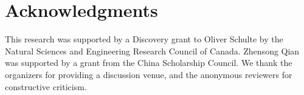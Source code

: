 \documentclass{acm_proc_article-sp}
\begin{document}
\section{Acknowledgments}

This research was supported by a Discovery grant to Oliver Schulte by the Natural Sciences and Engineering Research Council of Canada. 
Zhensong Qian was supported by a grant from the China Scholarship Council.
We thank the organizers for providing a discussion venue, and the anonymous reviewers for constructive criticism.



 


\end{document}
